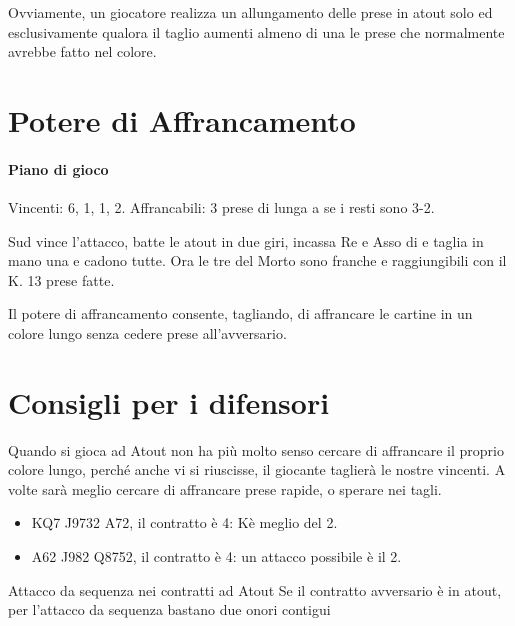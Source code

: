 \documentclass[../corsofiori.tex]{subfiles}
\begin{document}
Ovviamente, un giocatore realizza un allungamento delle prese in atout solo ed esclusivamente qualora il taglio aumenti
almeno di una le prese che normalmente avrebbe fatto nel colore.

\section{Potere di Affrancamento}

\newgame
{}
\leftupper{\boardtext*}%
{\dealertext\quad}{\vulnertext}

\showAll*

\paragraph{Piano di gioco} Vincenti: 6\Sp, 1\He, 1\Di, 2\Cl. Affrancabili: 3 prese di lunga a \fio se i resti sono 3-2.

Sud vince l'attacco, batte le atout in due giri, incassa Re e Asso di \fio e taglia in mano una \fio e cadono tutte. Ora
le tre \fio del Morto sono franche e raggiungibili con il K\He. 13 prese fatte.

Il potere di affrancamento consente, tagliando, di affrancare le cartine in un colore lungo senza cedere prese
all'avversario.

\section{Consigli per i difensori}

Quando si gioca ad Atout non ha più molto senso cercare di affrancare il proprio colore lungo, perché anche vi si
riuscisse, il giocante taglierà le nostre vincenti. A volte sarà meglio cercare di affrancare prese rapide, o sperare
nei tagli.
\begin{itemize}
    \item \Sp KQ7  \Di J9732 \Cl A72, il contratto è 4\He: K\Sp è meglio del 2\Di.
    \item {} \He A62 \Di J982 \Cl Q8752, il contratto è 4\He: un attacco possibile è il 2\Sp.
\end{itemize}

\begin{regola}{Attacco da sequenza nei contratti ad Atout}
    Se il contratto avversario è in atout, per l'attacco da sequenza bastano due onori contigui
\end{regola}
\end{document}
